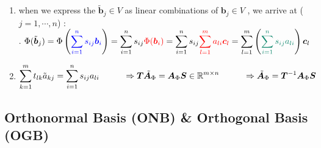 \begin{enumerate}
\begin{enumerate}
        \item when we express the $\tilde{\bm{b}}_j \in V$ as linear combinations of $\bm{b}_j \in V$ , we arrive at ($j = 1,\cdots, n$) :
        \hfill \cite{mfml/book/mml/Deisenroth-Faisal-Ong}
        \\
        .\hfill
        $
            \Phi (\tilde{\bm{b}}_j ) 
            = \Phi  \dParenBrac{ \textcolor{blue}{\dsum ^n _{i=1} s_{ij} \bm{b}_i}}
            = \dsum ^n _{i=1} s_{ij} \textcolor{red}{\Phi (\bm{b}_i)} 
            = \dsum^n _{i=1} s_{ij} \textcolor{red}{\dsum ^m _{l=1} a_{li} \bm{c}_l}
            = \dsum ^m _{l=1} \dParenBrac{ \textcolor{PineGreen}{\dsum^n _{i=1} s_{ij} a_{li}} } \bm{c}_l
        $
        \hfill \cite{mfml/book/mml/Deisenroth-Faisal-Ong}

        \item $
            \begin{aligned}
                \displaystyle\sum^m_{k=1} t_{lk} \tilde{a}_{kj} = \displaystyle\sum^n _{i=1} s_{ij} a_{li}
                \hspace{1cm}
                \Rightarrow 
                \bm{T} \tilde{\bm{A}}_\Phi = \bm{A}_\Phi \bm{S} 
                \in \mathbb{R}^{m\times n}
                \hspace{1cm}
                \Rightarrow 
                \tilde{\bm{A}}_\Phi = \bm{T}^{-1} \bm{A}_\Phi \bm{S}
            \end{aligned}
        $
        \hfill \cite{mfml/book/mml/Deisenroth-Faisal-Ong}        
    \end{enumerate}

    
\end{enumerate}






\subsection{Orthonormal Basis (ONB) \& Orthogonal Basis (OGB)}


